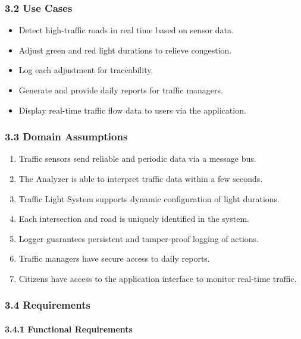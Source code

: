\subsubsection*{3.2 Use Cases}

\begin{itemize}
    \item Detect high-traffic roads in real time based on sensor data.
    \item Adjust green and red light durations to relieve congestion.
    \item Log each adjustment for traceability.
    \item Generate and provide daily reports for traffic managers.
    \item Display real-time traffic flow data to users via the application.
\end{itemize}

\subsubsection*{3.3 Domain Assumptions}

\begin{enumerate}
    \item Traffic sensors send reliable and periodic data via a message bus.
    \item The Analyzer is able to interpret traffic data within a few seconds.
    \item Traffic Light System supports dynamic configuration of light durations.
    \item Each intersection and road is uniquely identified in the system.
    \item Logger guarantees persistent and tamper-proof logging of actions.
    \item Traffic managers have secure access to daily reports.
    \item Citizens have access to the application interface to monitor real-time traffic.
\end{enumerate}

\subsubsection*{3.4 Requirements}

\paragraph{3.4.1 Functional Requirements}


